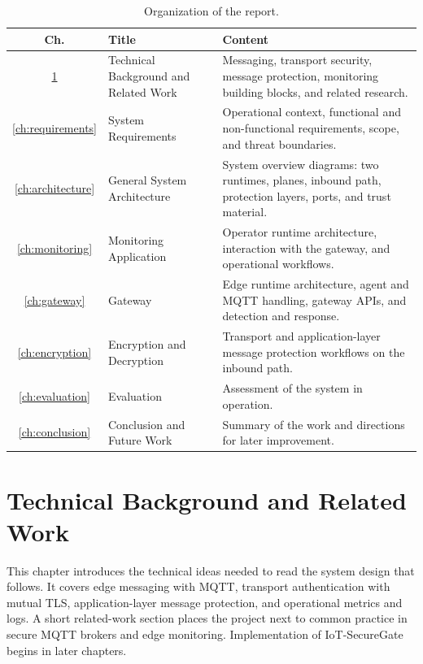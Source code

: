 \documentclass[12pt,a4paper]{report}
\begin{document}
\begin{table}[H]
\centering
\begin{tabularx}{\textwidth}{|c|Y|Y|}
\hline
\textbf{Ch.} & \textbf{Title} & \textbf{Content} \\
\hline
\ref{ch:background}
& Technical Background and Related Work
& Messaging, transport security, message protection,
  monitoring building blocks, and related research. \\
\hline
\ref{ch:requirements}
& System Requirements
& Operational context, functional and non-functional
  requirements, scope, and threat boundaries. \\
\hline
\ref{ch:architecture}
& General System Architecture
& System overview diagrams: two runtimes, planes,
  inbound path, protection layers, ports, and trust
  material. \\
\hline
\ref{ch:monitoring}
& Monitoring Application
& Operator runtime architecture, interaction with the
  gateway, and operational workflows. \\
\hline
\ref{ch:gateway}
& Gateway
& Edge runtime architecture, agent and MQTT handling,
  gateway APIs, and detection and response. \\
\hline
\ref{ch:encryption}
& Encryption and Decryption
& Transport and application-layer message protection
  workflows on the inbound path. \\
\hline
\ref{ch:evaluation}
& Evaluation
& Assessment of the system in operation. \\
\hline
\ref{ch:conclusion}
& Conclusion and Future Work
& Summary of the work and directions for later
  improvement. \\
\hline
\end{tabularx}
\caption{Organization of the report.}
\label{tab:report-organization}
\end{table}


\chapter{Technical Background and Related Work}
\label{ch:background}

This chapter introduces the technical ideas needed to
read the system design that follows. It covers edge
messaging with MQTT, transport authentication with
mutual TLS, application-layer message protection,
and operational metrics and logs. A short related-work
section places the project next to common practice in
secure MQTT brokers and edge monitoring.
Implementation of IoT-SecureGate begins in later
chapters.
\end{document}
